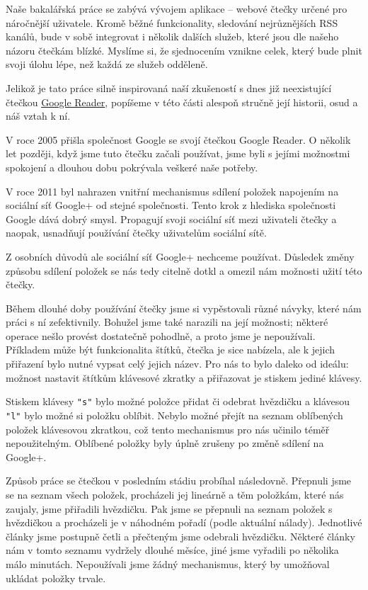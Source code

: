 
Naše bakalářská práce se zabývá vývojem aplikace -- webové čtečky určené pro náročnější uživatele.
Kromě běžné funkcionality, sledování nejrůznějších RSS kanálů, bude v sobě integrovat i několik dalších služeb, které jsou dle našeho názoru čtečkám blízké.
Myslíme si, že sjednocením vznikne celek, který bude plnit svoji úlohu lépe, než každá ze služeb odděleně.


Jelikož je tato práce silně inspirovaná naší zkušeností s dnes již neexistující čtečkou \href{http://www.google.com/reader/about/}{Google Reader}, popíšeme v této části alespoň stručně její historii, osud a náš vztah k ní.


V roce 2005 přišla společnost Google se svojí čtečkou Google Reader.
O několik let později, když jsme tuto čtečku začali používat, jsme byli s jejími možnostmi spokojení a dlouhou dobu pokrývala veškeré naše potřeby.

V roce 2011 byl nahrazen vnitřní mechanismus sdílení položek napojením na sociální síť Google+ od stejné společnosti.
Tento krok z hlediska společnosti Google dává dobrý smysl.
Propagují svoji sociální síť mezi uživateli čtečky a naopak, usnadňují používání čtečky uživatelům sociální sítě.

Z osobních důvodů ale sociální síť Google+ nechceme používat.
Důsledek změny způsobu sdílení položek se nás tedy citelně dotkl a omezil nám možnosti užití této čtečky.

Během dlouhé doby používání čtečky jsme si vypěstovali různé návyky, které nám práci s ní zefektivnily.
Bohužel jsme také narazili na její možnosti; některé operace nešlo provést dostatečně pohodlně, a proto jsme je nepoužívali.
Příkladem může být funkcionalita štítků, čtečka je sice nabízela, ale k jejich přiřazení bylo nutné vypsat celý jejich název.
Pro nás to bylo daleko od ideálu: možnost nastavit štítkům klávesové zkratky a přiřazovat je stiskem jediné klávesy.

Stiskem klávesy \verb|"s"| bylo možné položce přidat či odebrat hvězdičku a klávesou \verb|"l"| bylo možné si položku oblíbit.
Nebylo možné přejít na seznam oblíbených položek klávesovou zkratkou, což tento mechanismus pro nás učinilo téměř nepoužitelným.
Oblíbené položky byly úplně zrušeny po změně sdílení na Google+.

Způsob práce se čtečkou v posledním stádiu probíhal následovně.
Přepnuli jsme se na seznam všech položek, procházeli jej lineárně a těm položkám, které nás zaujaly, jsme přiřadili hvězdičku.
Pak jsme se přepnuli na seznam položek s hvězdičkou a procházeli je v náhodném pořadí (podle aktuální nálady).
Jednotlivé články jsme postupně četli a přečteným jsme odebrali hvězdičku.
Některé články nám v tomto seznamu vydržely dlouhé měsíce, jiné jsme vyřadili po několika málo minutách.
Nepoužívali jsme žádný mechanismus, který by umožňoval ukládat položky trvale.

